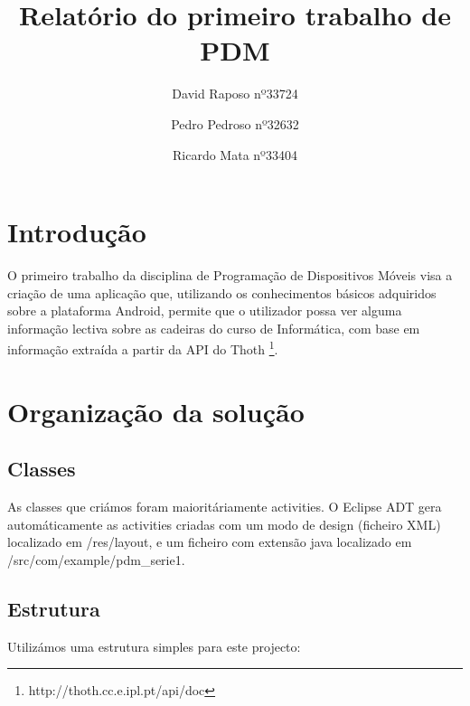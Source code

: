 \documentclass{article}
\begin{document}
\title{Relatório do primeiro trabalho de PDM}
\author{David Raposo nº33724\and Pedro Pedroso nº32632 \and Ricardo Mata nº33404}

\maketitle

\section{Introdução}
O primeiro trabalho da disciplina de Programação de Dispositivos Móveis visa a criação de uma aplicação que, utilizando os conhecimentos básicos
adquiridos sobre a plataforma Android, permite que o utilizador possa ver alguma informação lectiva sobre as cadeiras do curso de Informática, com base em
informação extraída a partir da API do Thoth \footnote{http://thoth.cc.e.ipl.pt/api/doc}.

\section{Organização da solução}
\subsection{Classes}
As classes que criámos foram maioritáriamente activities. O Eclipse ADT gera automáticamente as activities criadas com um modo de design (ficheiro XML)
localizado em /res/layout, e um ficheiro com extensão java localizado em /src/com/example/pdm\_serie1.

\subsection{Estrutura}
Utilizámos uma estrutura simples para este projecto:
\end{document}
